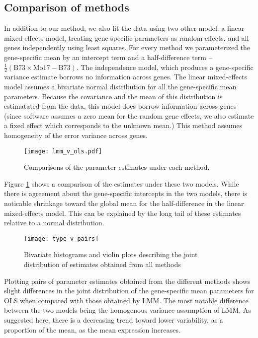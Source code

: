 \subsection{Comparison of methods}
In addition to our method, we also fit the data using two other model: a linear mixed-effects model, treating gene-specific parameters as random effects, and all genes independently using least squares. For every method we parameterized the gene-specific mean by an intercept term and a half-difference term -- $\frac{1}{2}(\mbox{B73}\times\mbox{Mo17}-\mbox{B73})$. The independence model, which produces a gene-specific variance estimate borrows no information across genes. The linear mixed-effects model assumes a bivariate normal distribution for all the gene-specific mean parameters. Because the covariance and the mean of this distribution is estimatated from the data, this model does borrow information across genes (since software assumes a zero mean for the random gene effects, we also estimate a fixed effect which corresponds to the unknown mean.) This method assumes homogeneity of the error variance across genes.

\begin{figure}
\texttt{[image: lmm\_v\_ols.pdf]}
\caption{Comparisons of the parameter estimates under each method.}
\label{lmm_v_ols}
\end{figure}
Figure \ref{lmm_v_ols} shows a comparison of the estimates under these two models. While there is agreement about the gene-specific intercepts in the two models, there is noticable shrinkage toward the global mean for the half-difference in the linear mixed-effects model. This can be explained by the long tail of these estimates relative to a normal distribution.

\begin{figure}
\texttt{[image: type\_v\_pairs]}
\caption{Bivariate histograms and violin plots describing the joint distribution of estimates obtained from all methods}
\label{type_v_pairs}
\end{figure}

Plotting pairs of parameter estimates obtained from the different methods shows slight differences in the joint distribution of the gene-specific mean parameters for OLS when compared with those obtained by LMM. The most notable difference between the two models being the homogenous variance assumption of LMM. As suggested here, there is a decreasing trend toward lower variability, as a proportion of the mean, as the mean expression increases.


